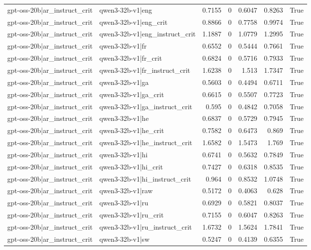 \begin{table}
\begin{tabular}{l l r r r r l}
gpt-oss-20b|ar_instruct_crit & qwen3-32b-v1|eng & 0.7155 & 0 & 0.6047 & 0.8263 & True \\
gpt-oss-20b|ar_instruct_crit & qwen3-32b-v1|eng_crit & 0.8866 & 0 & 0.7758 & 0.9974 & True \\
gpt-oss-20b|ar_instruct_crit & qwen3-32b-v1|eng_instruct_crit & 1.1887 & 0 & 1.0779 & 1.2995 & True \\
gpt-oss-20b|ar_instruct_crit & qwen3-32b-v1|fr & 0.6552 & 0 & 0.5444 & 0.7661 & True \\
gpt-oss-20b|ar_instruct_crit & qwen3-32b-v1|fr_crit & 0.6824 & 0 & 0.5716 & 0.7933 & True \\
gpt-oss-20b|ar_instruct_crit & qwen3-32b-v1|fr_instruct_crit & 1.6238 & 0 & 1.513 & 1.7347 & True \\
gpt-oss-20b|ar_instruct_crit & qwen3-32b-v1|ga & 0.5603 & 0 & 0.4494 & 0.6711 & True \\
gpt-oss-20b|ar_instruct_crit & qwen3-32b-v1|ga_crit & 0.6615 & 0 & 0.5507 & 0.7723 & True \\
gpt-oss-20b|ar_instruct_crit & qwen3-32b-v1|ga_instruct_crit & 0.595 & 0 & 0.4842 & 0.7058 & True \\
gpt-oss-20b|ar_instruct_crit & qwen3-32b-v1|he & 0.6837 & 0 & 0.5729 & 0.7945 & True \\
gpt-oss-20b|ar_instruct_crit & qwen3-32b-v1|he_crit & 0.7582 & 0 & 0.6473 & 0.869 & True \\
gpt-oss-20b|ar_instruct_crit & qwen3-32b-v1|he_instruct_crit & 1.6582 & 0 & 1.5473 & 1.769 & True \\
gpt-oss-20b|ar_instruct_crit & qwen3-32b-v1|hi & 0.6741 & 0 & 0.5632 & 0.7849 & True \\
gpt-oss-20b|ar_instruct_crit & qwen3-32b-v1|hi_crit & 0.7427 & 0 & 0.6318 & 0.8535 & True \\
gpt-oss-20b|ar_instruct_crit & qwen3-32b-v1|hi_instruct_crit & 0.964 & 0 & 0.8532 & 1.0748 & True \\
gpt-oss-20b|ar_instruct_crit & qwen3-32b-v1|raw & 0.5172 & 0 & 0.4063 & 0.628 & True \\
gpt-oss-20b|ar_instruct_crit & qwen3-32b-v1|ru & 0.6929 & 0 & 0.5821 & 0.8037 & True \\
gpt-oss-20b|ar_instruct_crit & qwen3-32b-v1|ru_crit & 0.7155 & 0 & 0.6047 & 0.8263 & True \\
gpt-oss-20b|ar_instruct_crit & qwen3-32b-v1|ru_instruct_crit & 1.6732 & 0 & 1.5624 & 1.7841 & True \\
gpt-oss-20b|ar_instruct_crit & qwen3-32b-v1|sw & 0.5247 & 0 & 0.4139 & 0.6355 & True \\

\end{tabular}
\end{table}
